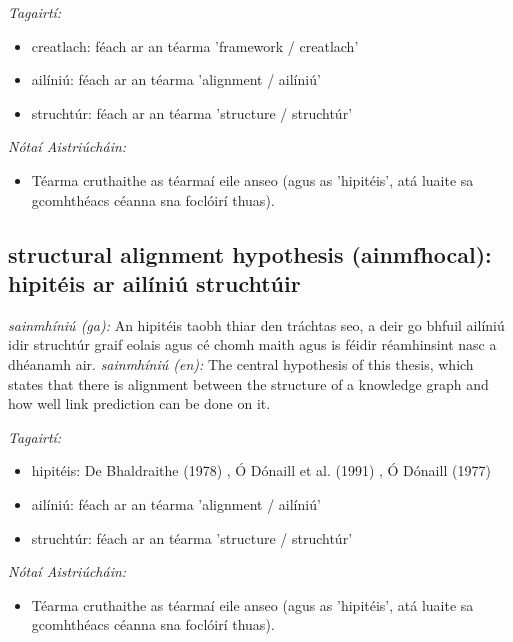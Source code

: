 \documentclass{article}
\begin{document}
 \noindent \textit{Tagairtí:}
\begin{itemize}
	\item creatlach: féach ar an téarma 'framework / creatlach'
	\item ailíniú: féach ar an téarma 'alignment / ailíniú'
	\item struchtúr: féach ar an téarma 'structure / struchtúr'
\end{itemize}

 \noindent \textit{Nótaí Aistriúcháin:}
\begin{itemize}
	\item Téarma cruthaithe as téarmaí eile anseo (agus as 'hipitéis', atá luaite sa gcomhthéacs céanna sna foclóirí thuas).
\end{itemize}


\subsection*{structural alignment hypothesis (ainmfhocal): hipitéis ar ailíniú struchtúir} 
 \noindent \textit{sainmhíniú (ga):} An hipitéis taobh thiar den tráchtas seo, a deir go bhfuil ailíniú idir struchtúr graif eolais agus cé chomh maith agus is féidir réamhinsint nasc a dhéanamh air.
\newline\newline
 \noindent \textit{sainmhíniú (en):} The central hypothesis of this thesis, which states that there is alignment between the structure of a knowledge graph and how well link prediction can be done on it.
\newline

 \noindent \textit{Tagairtí:}
\begin{itemize}
	\item hipitéis: De Bhaldraithe (1978) \cite{de-bhaldraithe}, Ó Dónaill et al. (1991) \cite{focloir-beag}, Ó Dónaill (1977) \cite{odonaill}
	\item ailíniú: féach ar an téarma 'alignment / ailíniú'
	\item struchtúr: féach ar an téarma 'structure / struchtúr'
\end{itemize}

 \noindent \textit{Nótaí Aistriúcháin:}
\begin{itemize}
	\item Téarma cruthaithe as téarmaí eile anseo (agus as 'hipitéis', atá luaite sa gcomhthéacs céanna sna foclóirí thuas).
\end{itemize}
\end{document}
